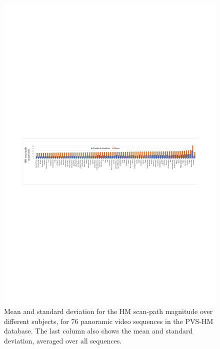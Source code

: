 \documentclass[10pt,journal,compsoc]{IEEEtran}
\begin{document}
\begin{figure}
	\begin{center}
		\centerline{\includegraphics[width=2\columnwidth]{figures/database/consistence-magnitude}}
		\caption{\footnotesize{Mean and standard deviation for the HM scan-path magnitude over different subjects, for 76 panoramic video sequences in the PVS-HM database. The last column also shows the mean and standard deviation, averaged over all sequences. }}
		\label{consistence-magnitude}
	\end{center}
\end{figure}
\end{document}
